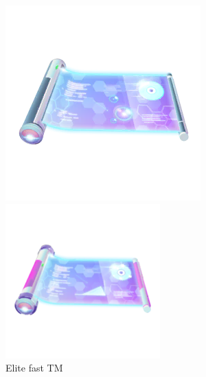 \begin{figure}[h]
  \begin{minipage}[t]{0.3\textwidth}
    \begin{center}
    \includegraphics[width=\textwidth]{images/elitefasttm.png}
    \end{center}
    \caption*{Elite fast TM}
    \label{fig:elitefasttm}
  \end{minipage}
  \begin{minipage}[t]{0.3\textwidth}
    \begin{center}
    \includegraphics[width=\textwidth]{images/elitechargedtm.png}

\end{center}
\end{minipage}
\end{figure}
